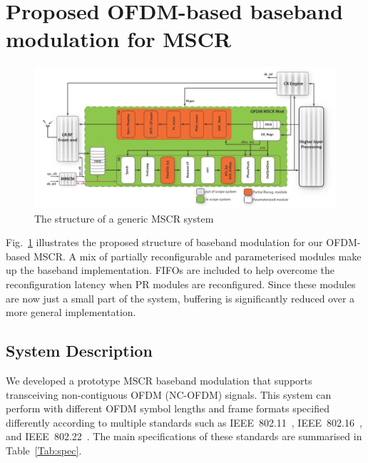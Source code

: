 \section{Proposed OFDM-based baseband modulation for MSCR}
\begin{figure}
\centering
\includegraphics[width=1\columnwidth]{Figures/MSCRFig.pdf}
\caption{The structure of a generic MSCR system}
\label{fig:struc}
\end{figure}

Fig.~\ref{fig:struc} illustrates the proposed structure of baseband modulation for our OFDM-based MSCR. 
A mix of partially reconfigurable and parameterised modules make up the baseband implementation.
FIFOs are included to help overcome the reconfiguration latency when PR modules are reconfigured. 
Since these modules are now just a small part of the system, buffering is significantly reduced over a more general implementation.

	\subsection{System Description}

We developed a prototype MSCR baseband modulation that supports transceiving non-contiguous OFDM (NC-OFDM) signals.
This system can perform with different OFDM symbol lengths and frame formats specified differently according to multiple standards such as IEEE~802.11~\cite{IEEE80211}, IEEE~802.16~\cite{IEEE80216}, and IEEE~802.22~\cite{IEEE80222}.
The main specifications of these standards are summarised in Table~\ref{Tab:spec}.

